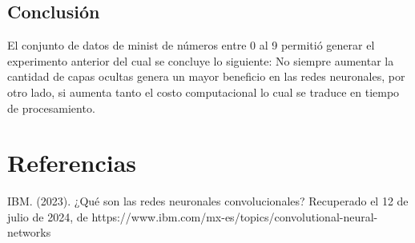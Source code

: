 \documentclass[a4paper,12pt]{article}
\begin{document}
\subsection{Conclusión}
El conjunto de datos de minist de números entre 0 al 9 permitió generar el experimento anterior del cual se concluye lo siguiente: No siempre aumentar la cantidad de capas ocultas genera un mayor beneficio en las redes neuronales, por otro lado, si aumenta tanto el costo computacional lo cual se traduce en tiempo de procesamiento.

\section{Referencias}

\begin{thebibliography}{9}
    IBM. (2023). ¿Qué son las redes neuronales convolucionales? Recuperado el 12 de julio de 2024, de https://www.ibm.com/mx-es/topics/convolutional-neural-networks

    
\end{thebibliography}
\end{document}
